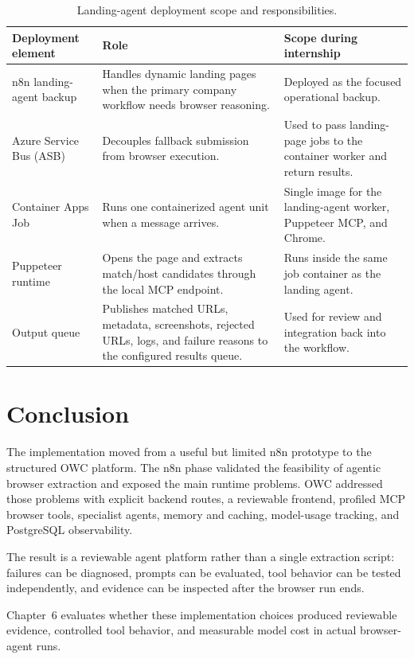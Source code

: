 

\begin{table}[!htbp]
\centering
\begin{tabularx}{\textwidth}{Q{2.8cm} Y Y}
\toprule
{}
Deployment element & Role & Scope during internship \\
\midrule
n8n landing-agent backup & Handles dynamic landing pages when the primary company
workflow needs browser reasoning. & Deployed as the focused operational backup. \\
Azure Service Bus (ASB) & Decouples fallback submission from browser execution. & Used to
pass landing-page jobs to the container worker and return results. \\
Container Apps Job & Runs one containerized agent unit when a message arrives. &
Single image for the landing-agent worker, Puppeteer MCP, and Chrome. \\
Puppeteer runtime & Opens the page and extracts match/host candidates through the
local MCP endpoint. & Runs inside the same job container as the landing agent. \\
Output queue & Publishes matched URLs, metadata, screenshots, rejected URLs, logs, and
failure reasons to the configured results queue. & Used for review and integration
back into the workflow. \\
\bottomrule
\end{tabularx}
\caption{Landing-agent deployment scope and responsibilities.}\label{tab:deployment-scope}
\end{table}

\section{Conclusion}
The implementation moved from a useful but limited n8n prototype to the structured OWC
platform. The n8n phase validated the feasibility of agentic browser extraction and
exposed the main runtime problems. OWC addressed those problems with explicit backend
routes, a reviewable frontend, profiled MCP browser tools, specialist agents, memory
and caching, model-usage tracking, and PostgreSQL observability.

The result is a reviewable agent platform rather than a single extraction script:
failures can be diagnosed, prompts can be evaluated, tool behavior can be tested
independently, and evidence can be inspected after the browser run ends.

Chapter~6 evaluates whether these implementation choices produced reviewable evidence,
controlled tool behavior, and measurable model cost in actual browser-agent runs.
